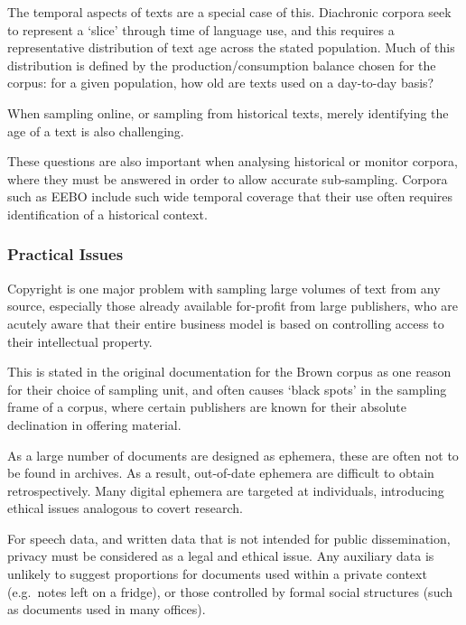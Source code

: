 The temporal aspects of texts are a special case of this.  Diachronic corpora seek to represent a `slice' through time of language use, and this requires a representative distribution of text age across the stated population.  Much of this distribution is defined by the production/consumption balance chosen for the corpus: for a given population, how old are texts used on a day-to-day basis?

When sampling online, or sampling from historical texts, merely identifying the age of a text is also challenging.

These questions are also important when analysing historical or monitor corpora, where they must be answered in order to allow accurate sub-sampling.  Corpora such as EEBO\cite{blum2002early} include such wide temporal coverage that their use often requires identification of a historical context.







\subsubsection{Practical Issues}
Copyright is one major problem with sampling large volumes of text from any source, especially those already available for-profit from large publishers, who are acutely aware that their entire business model is based on controlling access to their intellectual property.

This is stated in the original documentation for the Brown corpus as one reason for their choice of sampling unit, and often causes `black spots' in the sampling frame of a corpus, where certain publishers are known for their absolute declination in offering material.

%

As a large number of documents are designed as ephemera, these are often not to be found in archives.  As a result, out-of-date ephemera are difficult to obtain retrospectively.  Many digital ephemera are targeted at individuals, introducing ethical issues analogous to covert research.

For speech data, and written data that is not intended for public dissemination, privacy must be considered as a legal and ethical issue.  Any auxiliary data is unlikely to suggest proportions for documents used within a private context (e.g.\ notes left on a fridge), or those controlled by formal social structures (such as documents used in many offices).

